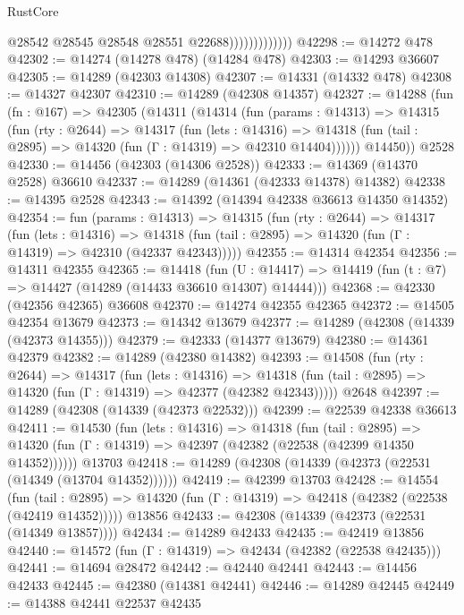 \begin{lexlean}{RustCore}
\begin{coremodule}
                              @28542
                              @28545
                              @28548
                              @28551
                              @22688)))))))))))))
@42298 := @14272 @478
@42302 := @14274 (@14278 @478) (@14284 @478)
@42303 := @14293 @36607
@42305 := @14289 (@42303 @14308)
@42307 := @14331 (@14332 @478)
@42308 := @14327 @42307
@42310 := @14289 (@42308 @14357)
@42327 := @14288
    (fun (fn : @167) =>
    @42305
      (@14311
        (@14314
          (fun (params : @14313) =>
          @14315
            (fun (rty : @2644) =>
            @14317
              (fun (lets : @14316) =>
              @14318 (fun (tail : @2895) => @14320 (fun (Γ : @14319) => @42310 @14404))))))
        @14450))
    @2528
@42330 := @14456 (@42303 (@14306 @2528))
@42333 := @14369 (@14370 @2528) @36610
@42337 := @14289 (@14361 (@42333 @14378) @14382)
@42338 := @14395 @2528
@42343 := @14392 (@14394 @42338 @36613 @14350 @14352)
@42354 := fun (params : @14313) =>
  @14315
    (fun (rty : @2644) =>
    @14317
      (fun (lets : @14316) =>
      @14318 (fun (tail : @2895) => @14320 (fun (Γ : @14319) => @42310 (@42337 @42343)))))
@42355 := @14314 @42354
@42356 := @14311 @42355
@42365 := @14418
    (fun (U : @14417) => @14419 (fun (t : @7) => @14427 (@14289 (@14433 @36610 @14307) @14444)))
@42368 := @42330 (@42356 @42365) @36608
@42370 := @14274 @42355 @42365
@42372 := @14505 @42354 @13679
@42373 := @14342 @13679
@42377 := @14289 (@42308 (@14339 (@42373 @14355)))
@42379 := @42333 (@14377 @13679)
@42380 := @14361 @42379
@42382 := @14289 (@42380 @14382)
@42393 := @14508
    (fun (rty : @2644) =>
    @14317
      (fun (lets : @14316) =>
      @14318 (fun (tail : @2895) => @14320 (fun (Γ : @14319) => @42377 (@42382 @42343)))))
    @2648
@42397 := @14289 (@42308 (@14339 (@42373 @22532)))
@42399 := @22539 @42338 @36613
@42411 := @14530
    (fun (lets : @14316) =>
    @14318
      (fun (tail : @2895) =>
      @14320 (fun (Γ : @14319) => @42397 (@42382 (@22538 (@42399 @14350 @14352))))))
    @13703
@42418 := @14289 (@42308 (@14339 (@42373 (@22531 (@14349 (@13704 @14352))))))
@42419 := @42399 @13703
@42428 := @14554
    (fun (tail : @2895) => @14320 (fun (Γ : @14319) => @42418 (@42382 (@22538 (@42419 @14352)))))
    @13856
@42433 := @42308 (@14339 (@42373 (@22531 (@14349 @13857))))
@42434 := @14289 @42433
@42435 := @42419 @13856
@42440 := @14572 (fun (Γ : @14319) => @42434 (@42382 (@22538 @42435)))
@42441 := @14694 @28472
@42442 := @42440 @42441
@42443 := @14456 @42433
@42445 := @42380 (@14381 @42441)
@42446 := @14289 @42445
@42449 := @14388 @42441 @22537 @42435

\end{coremodule}
\end{lexlean}
